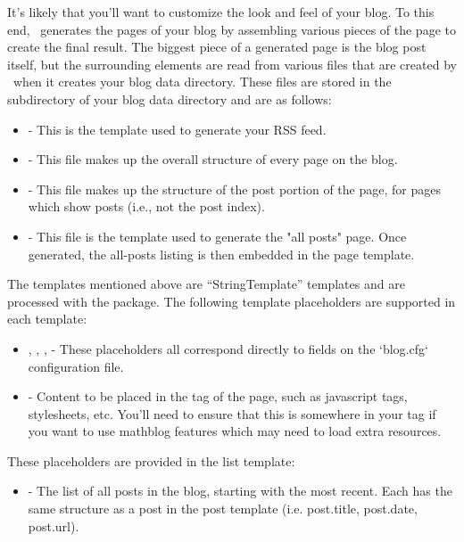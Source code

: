 \documentclass[11pt, letterpaper, oneside, titlepage]{book}
\begin{document}
It's likely that you'll want to customize the look and feel of your
blog.  To this end, \mathblog\ generates the pages of your blog by
assembling various pieces of the page to create the final result.  The
biggest piece of a generated page is the blog post itself, but the
surrounding elements are read from various files that are created by
\mathblog\ when it creates your blog data directory.  These files are
stored in the  subdirectory of your blog data directory
and are as follows:

\begin{itemize}
\item{ - This is the template used to
  generate your RSS feed.}
\item{ - This file makes up the
  overall structure of every page on the blog.}
\item{ - This file makes up the
  structure of the post portion of the page, for pages which show
  posts (i.e., not the post index).}
\item{ - This file is the template
  used to generate the "all posts" page.  Once generated, the
  all-posts listing is then embedded in the page template.}
\end{itemize}

The templates mentioned above are ``StringTemplate'' templates and are
processed with the  package.  The following
template placeholders are supported in each template:

\begin{itemize}
\item{, , ,
   - These placeholders all correspond directly to
  fields on the `blog.cfg` configuration file.}
\item{ - Content to be placed in the 
  tag of the page, such as javascript tags, stylesheets, etc.  You'll
  need to ensure that this is somewhere in your  tag if you
  want to use mathblog features which may need to load extra
  resources.}
\end{itemize}

These placeholders are provided in the list template:

\begin{itemize}
\item{ - The list of all posts in the blog, starting with
  the most recent.  Each has the same structure as a post in the post
  template (i.e. post.title, post.date, post.url).}
\end{itemize}
\end{document}
